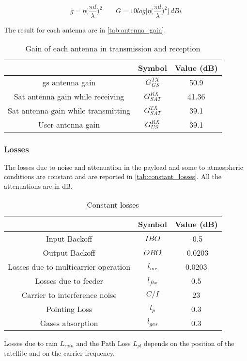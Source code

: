 		\begin{equation}\label{eq:gain}
			g = \eta\bigg(\frac{\pi d}{\lambda}\bigg)^2 \qquad G = 10log\bigg[\eta\bigg(\frac{\pi d}{\lambda}\bigg)^2\bigg] ~dBi
		\end{equation}

		The result for each antenna are in \autoref{tab:antenna_gain}.

		\begin{table}[h]
			\centering
			\begin{tabular}{ccc}
			\toprule
			& Symbol & Value (dB)\\
			\midrule
			\gls{gs} antenna gain & $G_{GS}^{TX}$ & 50.9\\
			Sat antenna gain while receiving & $G_{SAT}^{RX}$  & 41.36\\
			Sat antenna gain while transmitting & $G_{SAT}^{TX}$ & 39.1\\
			User antenna gain & $G_{US}^{RX}$ & 39.1\\
			\bottomrule
			\end{tabular}
			\caption{Gain of each antenna in transmission and reception}
			\label{tab:antenna_gain}
		\end{table}

	\subsubsection{Losses}
		The losses due to noise and attenuation in the payload and some to atmospheric conditions are constant and are reported in \autoref{tab:constant_losses}. All the attenuations are in dB.

		\begin{table}[h]
			\centering
			\begin{tabular}{ccc}
			\toprule
			& Symbol & Value (dB)\\
			\midrule
			Input Backoff & $IBO$ & -0.5\\
			Output Backoff & $OBO$ & -0.0203\\
			Losses due to multicarrier operation & $l_{mc}$ & 0.0203\\
			Losses due to feeder & $l_{ftx}$  & 0.5\\
			Carrier to interference noise & $C/I$  & 23\\
			Pointing Loss & $l_p$ & 0.3\\
			Gases absorption & $l_{gas}$ & 0.3\\
			\bottomrule
			\end{tabular}
			\caption{Constant losses}
			\label{tab:constant_losses}
		\end{table}
		Losses due to rain $L_{rain}$ and the Path Loss $L_{pl}$ depends on the position of the satellite and on the carrier frequency.

